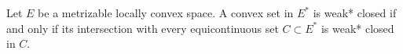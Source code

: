 Let $E$ be a metrizable locally convex space. A convex set in $E^*$ is weak* closed if and only if its intersection with every equicontinuous set $C \subset E^*$ is weak* closed in $C$.
